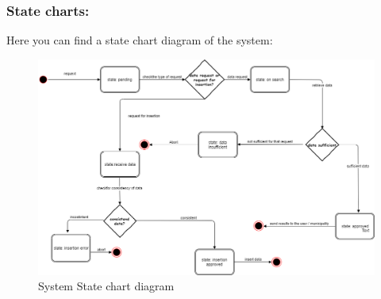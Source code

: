 \documentclass[titlepage]{article}
\begin{document}
\subsubsection{State charts: }
Here you can find a state chart diagram of the system:

\begin{figure}[h
]
    \includegraphics[scale=0.3]{State_chart.png}
	\centering
	\caption{System State chart diagram}
\end{figure}
\FloatBarrier
\end{document}

